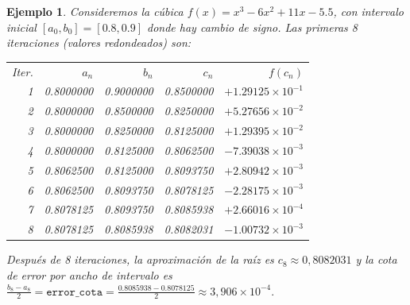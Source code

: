 \documentclass[12pt]{article}
\newtheorem{Ejem}{Ejemplo}%
\begin{document}
\begin{Ejem}
Consideremos la cúbica $f(x)=x^3-6x^2+11x-5.5$, con intervalo inicial $[a_0,b_0]=[0.8,0.9]$ donde hay cambio de signo. Las primeras 8 iteraciones (valores redondeados) son:

\begin{center}
\begin{tabular}{@{}rrrrr@{}}
Iter. & $a_n$ & $b_n$ & $c_n$ & $f(c_n)$ \\
1 & 0.8000000 & 0.9000000 & 0.8500000 & $+1.29125\times10^{-1}$ \\
2 & 0.8000000 & 0.8500000 & 0.8250000 & $+5.27656\times10^{-2}$ \\
3 & 0.8000000 & 0.8250000 & 0.8125000 & $+1.29395\times10^{-2}$ \\
4 & 0.8000000 & 0.8125000 & 0.8062500 & $-7.39038\times10^{-3}$ \\
5 & 0.8062500 & 0.8125000 & 0.8093750 & $+2.80942\times10^{-3}$ \\
6 & 0.8062500 & 0.8093750 & 0.8078125 & $-2.28175\times10^{-3}$ \\
7 & 0.8078125 & 0.8093750 & 0.8085938 & $+2.66016\times10^{-4}$ \\
8 & 0.8078125 & 0.8085938 & 0.8082031 & $-1.00732\times10^{-3}$ \\
\end{tabular}
\end{center}

Después de 8 iteraciones, la aproximación de la raíz es $c_8 \approx 0{,}8082031$ y la cota de error por ancho de intervalo es
$\frac{b_8-a_8}{2} = \texttt{error\_cota} = \frac{0.8085938-0.8078125}{2} \approx 3{,}906\times10^{-4}.$

\end{Ejem}
\end{document}
